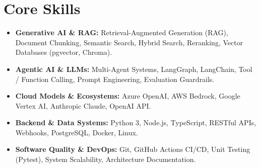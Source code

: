 \documentclass[a4paper,10pt]{article}
\begin{document}
\section{Core Skills}
\begin{itemize}
  \item \textbf{Generative AI \& RAG:} Retrieval-Augmented Generation (RAG), Document Chunking, Semantic Search, Hybrid Search, Reranking, Vector Databases (pgvector, Chroma).
  \item \textbf{Agentic AI \& LLMs:} Multi-Agent Systems, LangGraph, LangChain, Tool / Function Calling, Prompt Engineering, Evaluation Guardrails.
  \item \textbf{Cloud Models \& Ecosystems:} Azure OpenAI, AWS Bedrock, Google Vertex AI, Anthropic Claude, OpenAI API.
  \item \textbf{Backend \& Data Systems:} Python 3, Node.js, TypeScript, RESTful APIs, Webhooks, PostgreSQL, Docker, Linux.
  \item \textbf{Software Quality \& DevOps:} Git, GitHub Actions CI/CD, Unit Testing (Pytest), System Scalability, Architecture Documentation.
\end{itemize}
\end{document}
